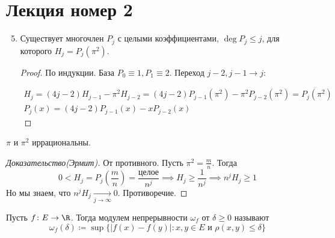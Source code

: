 \section{Лекция номер 2}

\begin{enumerate}
\setcounter{enumi}{4}
  \item Существует многочлен $P_j$ с целыми коэффициентами, $\deg P_j \leq j$,
для которого $H_j = P_j(\pi^2)$.
  \begin{proof}
    По индукции. База $P_0 \equiv 1, P_1 \equiv 2$. Переход $j - 2, j - 1 \to j$:

    \begin{equation*}
      \begin{gathered}
        H_j = (4j - 2)H_{j - 1} - \pi^2H_{j - 2} = (4j - 2)P_{j - 1}(\pi^2) -
        \pi^2P_{j - 2}(\pi^2) = P_j(\pi^2)\\
        P_j(x) = (4j - 2)P_{j - 1}(x) - xP_{j - 2}(x)
      \end{gathered}
    \end{equation*}
  \end{proof}
\end{enumerate}

\begin{theorem}[Ламберта]
    $\pi$ и $\pi^2$ иррациональны.
\end{theorem}
\begin{proof}[Доказательство(Эрмит)]
    От противного. Пусть $\pi^2 = \frac{m}{n}$. Тогда
    \begin{equation*}
        0 < H_j = P_j(\frac{m}{n}) = \frac{\text{целое}}{n^{j}} \implies
        H_j \geq \frac{1}{n^j} \implies n^{j}H_{j} \geq 1
    \end{equation*}
    Но мы знаем, что $n^jH_j \underset{j \to \infty}{\longrightarrow} 0$. Противоречие.
\end{proof}

\begin{conj}
    Пусть $f\colon E \to \R$. Тогда модулем непрерывности $\omega_f$ от $\delta \geq 0$ называют
    \begin{equation*}
      \omega_f(\delta) \coloneqq
      \sup\{|f(x) - f(y)| : x, y \in E
      \text{ и }\rho(x, y) \leq
      \delta\}
    \end{equation*}
\end{conj}

